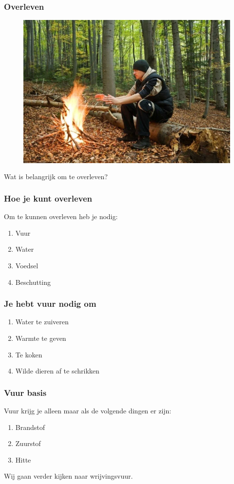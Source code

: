 \documentclass[a4paper, handout]{beamer}
\begin{document}
\begin{frame}
	\frametitle{Overleven}
	\begin{figure}
		\centering
	\includegraphics[width=0.7\linewidth]{man-bij-vuur}
\end{figure}

Wat is belangrijk om te overleven?
\end{frame}
\begin{frame}
	\frametitle{Hoe je kunt overleven}
	Om te kunnen overleven heb je nodig:
	\begin{enumerate}
		\item{Vuur}
		\item{Water}
		\item{Voedsel}
		\item{Beschutting}
	\end{enumerate}
\end{frame}

\begin{frame}
	\frametitle{Je hebt vuur nodig om}
	\begin{enumerate}
		\item{Water te zuiveren}
		\item{Warmte te geven}
		\item{Te koken}
		\item{Wilde dieren af te schrikken}
	\end{enumerate}
\end{frame}

\begin{frame}
	\frametitle{Vuur basis}
	Vuur krijg je alleen maar als de volgende dingen er zijn:
	\begin{enumerate}
		\item{Brandstof}
		\item{Zuurstof}
		\item{Hitte}
	\end{enumerate}
	Wij gaan verder kijken naar wrijvingsvuur.
\end{frame}
\end{document}
